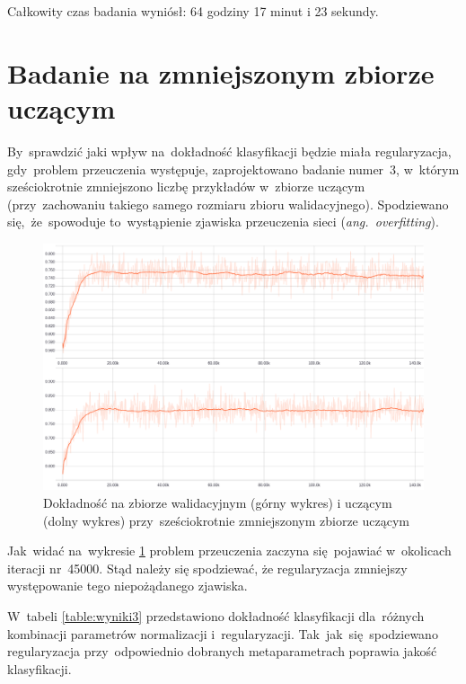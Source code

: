 Całkowity czas badania wyniósł: 64 godziny 17 minut i 23 sekundy.


\section{Badanie na zmniejszonym zbiorze uczącym}
By~sprawdzić jaki wpływ na~dokładność klasyfikacji będzie miała regularyzacja, gdy~problem przeuczenia występuje,
zaprojektowano badanie numer~3, w~którym sześciokrotnie zmniejszono liczbę przykładów w~zbiorze uczącym (przy~zachowaniu
takiego samego rozmiaru zbioru walidacyjnego). Spodziewano się,~że~spowoduje to~wystąpienie zjawiska przeuczenia sieci
(\textit{ang.~overfitting}).

\begin{figure}[H]
	\centering
	\includegraphics[width=\linewidth]{img/badanie_3.png}
	\caption{Dokładność na zbiorze walidacyjnym (górny wykres) i uczącym (dolny wykres) przy~sześciokrotnie
	         zmniejszonym zbiorze uczącym}
	\label{rys:badanie-3}
\end{figure}

Jak~widać na~wykresie \ref{rys:badanie-3} problem przeuczenia zaczyna się~pojawiać w~okolicach iteracji nr~45000.
Stąd należy się spodziewać, że regularyzacja zmniejszy występowanie tego niepożądanego zjawiska.

W~tabeli \ref{table:wyniki3} przedstawiono dokładność klasyfikacji dla~różnych kombinacji parametrów normalizacji
i~regularyzacji. Tak~jak~się~spodziewano regularyzacja przy~odpowiednio dobranych metaparametrach poprawia jakość
klasyfikacji.

